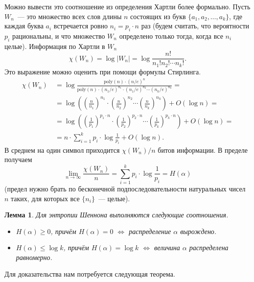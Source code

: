 \documentclass[12pt]{article}
\newcommand{\seqn}[2]{{#1}_1,{#1}_2,\dotsc,{#1}_{#2}}
\newcommand{\poly}{\mathrm{poly}}
\theoremstyle{definition}
\theoremstyle{plain}
\newtheorem{lemma}{Лемма}[section]
\theoremstyle{remark}
\begin{document}
Можно вывести это соотношение из определения Хартли более формально. 
Пусть $W_n$~--- это множество всех слов длины $n$ состоящих из букв $\{\seqn{a}{k}\}$,
где каждая буква $a_i$ встречается ровно $n_i = p_i\cdot n$ раз
(будем считать, что вероятности $p_i$ рациональны, и что множество 
$W_n$ определено только тогда, когда все $n_i$ целые).
Информация по Хартли в $W_n$ 
\[
    \chi(W_n) = \log |W_n| = \log \frac{n!}{n_1!n_2!\dotsb n_k!}.
\]
Это выражение можно оценить при помощи формулы Стирлинга.
\[
    \begin{aligned}
    \chi(W_n)&\ =  \log \frac{\poly(n)\cdot (n/e)^n}
    {\poly(n)\cdot(n_1/e)^{n_1}\cdot(n_1/e)^{n_2}\dotsm(n_k/e)^{n_k}} =\\
    &\ = \log \left(\left(\frac{n}{n_1}\right)^{n_1}\cdot
                    \left(\frac{n}{n_2}\right)^{n_2}\dotsm
                    \left(\frac{n}{n_k}\right)^{n_k}\right) + O(\log n) =\\
    &\ = \log \left(\left(\frac{1}{p_1}\right)^{p_1\cdot n}\cdot
                    \left(\frac{1}{p_2}\right)^{p_2\cdot n}\dotsm
                    \left(\frac{1}{p_k}\right)^{p_k\cdot n}\right) + O(\log n) =\\
    &\ = n \cdot \sum_{i=1}^k p_i \cdot \log\frac{1}{p_i} + O(\log n).
    \end{aligned}
\]
В среднем на один символ приходится $\chi(W_n)/n$ битов информации.
В пределе получаем
\[
    \lim_{n\to \infty}\frac{\chi(W_n)}{n} = \sum_{i=1}^k p_i \cdot \log\frac{1}{p_i} = H(\alpha)
\]
(предел нужно брать по бесконечной подпоследовательности натуральных чисел $n$ таких,
для которых все $\{n_i\}$~--- целые).
 

\begin{lemma}\label{lm:entropy-properties}
Для энтропии Шеннона выполняются следующие соотношения.
\begin{itemize}
\item \(H(\alpha) \ge 0\), причём \(H(\alpha) = 0\) \(\iff\) распределение \(\alpha\) вырождено.

\item \(H(\alpha) \le \log k\), причём \(H(\alpha) = \log k\) \(\iff\) величина \(\alpha\) распределена равномерно.

\end{itemize}
\end{lemma}

Для доказательства нам потребуется следующая теорема.
\end{document}
